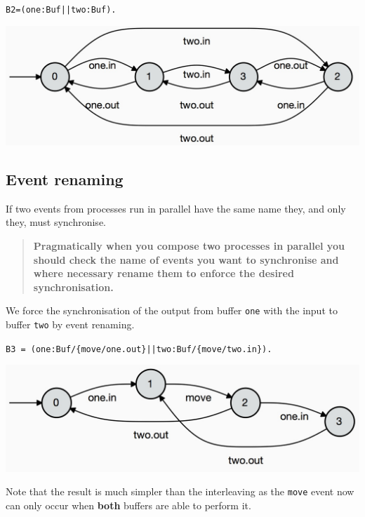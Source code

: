 \documentclass[]{article}
\begin{document}
\noindent\begin{center}\verb$B2=(one:Buf||two:Buf).$\end{center}

\noindent\begin{center} \includegraphics[scale=0.15]{B2.jpg} \end{center}


\subsection{Event renaming}
If two events from processes run in parallel have the same name they, and only they,  must synchronise.
\begin{quote}
{\bf Pragmatically when you compose two processes in parallel you should check the name of events   you want to   synchronise and where necessary rename them to enforce the desired synchronisation.}
\end{quote}


We force the synchronisation of the output from buffer \verb$one$ with the input to buffer \verb$two$ by event renaming.


\noindent\begin{center}\verb$B3 = (one:Buf/{move/one.out}||two:Buf/{move/two.in}).$\end{center}

\noindent\begin{center} \includegraphics[scale=0.15]{B3.jpg} \end{center}

Note that the result is much simpler than the interleaving as the \verb$move$ event now can only occur when {\bf both} buffers are able to perform it.
\end{document}
